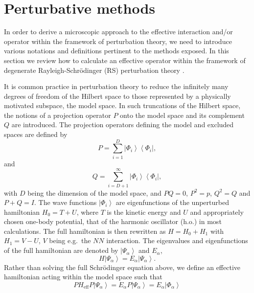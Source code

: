 \section{Perturbative methods}
\label{sec:sec2}


In order to derive a microscopic approach to the effective interaction and/or operator 
within the framework of perturbation theory, we need to introduce various
notations and definitions pertinent to the methods exposed.
In this section we review how to calculate an effective 
operator within the framework of 
degenerate Rayleigh-Schr\"{o}dinger
(RS) perturbation theory \cite{ko90,lm85}. 

It is common practice in perturbation theory to reduce the infinitely
many degrees of freedom of the Hilbert space to those represented
by a physically motivated subspace, the model space.
In such truncations of the Hilbert space, the notions of a projection
operator $P$ onto the model space and its complement $Q$ are
introduced. The projection operators defining the model and excluded
spaces are defined by
\begin{equation}
        P=\sum_{i=1}^{D} \left|\Phi_i\right\rangle
        \left\langle\Phi_i\right |,
\end{equation}
and
\begin{equation}
        Q=\sum_{i=D+1}^{\infty} \left|\Phi_i\right\rangle
        \left\langle\Phi_i\right |,
\end{equation}
with $D$ being the dimension of the model space, and $PQ=0$, $P^2 =p$,
$Q^2 =Q$ and $P+Q=I$. The wave functions $\left|\Phi_i\right\rangle$ 
are eigenfunctions
of the unperturbed hamiltonian $H_0 = T+U$, where $T$ is the kinetic
energy and $U$ and appropriately chosen one-body potential, that of the
harmonic oscillator (h.o.) in most calculations. The full hamiltonian
is then rewritten as $H=H_0 +H_1$ with $H_1=V-U$, $V$ being e.g.\ the
$NN$    interaction. The eigenvalues
and eigenfunctions of the full hamiltonian are denoted by
$\left|\Psi_{\alpha}\right\rangle$
and $E_{\alpha}$,
\begin{equation}
                H\left|\Psi_{\alpha}\right\rangle= 
                E_{\alpha}\left|\Psi_{\alpha}\right\rangle.
\end{equation}
Rather than solving the full Schr\"{o}dinger equation above, we define
an effective hamiltonian acting within the model space such
that
\begin{equation}
               PH_{\mathrm{eff}}P\left|\Psi_{\alpha}\right\rangle=
               E_{\alpha}P\left|\Psi_{\alpha}\right\rangle=
              E_{\alpha}\left|\Phi_{\alpha}\right\rangle
\end{equation}
